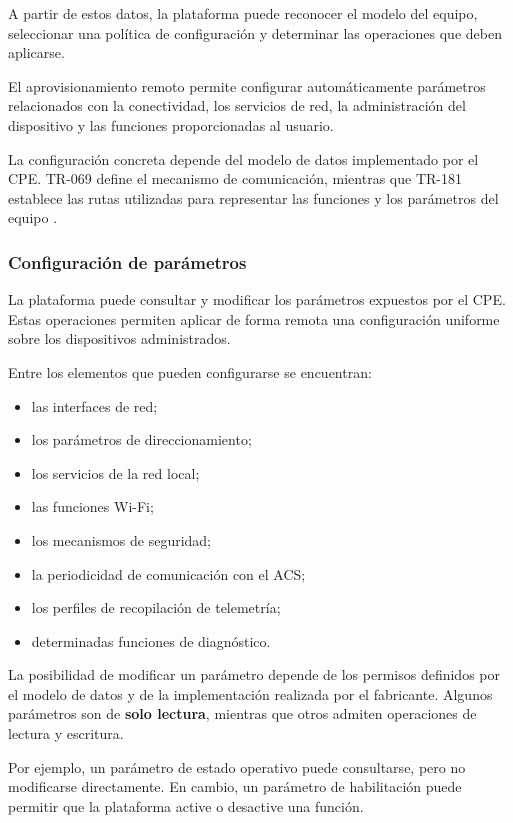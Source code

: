 A partir de estos datos, la plataforma puede reconocer el modelo del
equipo, seleccionar una política de configuración y determinar las
operaciones que deben aplicarse.

El aprovisionamiento remoto permite configurar automáticamente parámetros
relacionados con la conectividad, los servicios de red, la administración
del dispositivo y las funciones proporcionadas al usuario.

La configuración concreta depende del modelo de datos implementado por el
CPE. TR-069 define el mecanismo de comunicación, mientras que TR-181
establece las rutas utilizadas para representar las funciones y los
parámetros del equipo \cite{bbf_tr069,bbf_tr181}.


\subsubsection*{Configuración de parámetros}

La plataforma puede consultar y modificar los parámetros expuestos por el
CPE. Estas operaciones permiten aplicar de forma remota una configuración
uniforme sobre los dispositivos administrados.

Entre los elementos que pueden configurarse se encuentran:

\begin{itemize}
    \item las interfaces de red;
    \item los parámetros de direccionamiento;
    \item los servicios de la red local;
    \item las funciones Wi-Fi;
    \item los mecanismos de seguridad;
    \item la periodicidad de comunicación con el ACS;
    \item los perfiles de recopilación de telemetría;
    \item determinadas funciones de diagnóstico.
\end{itemize}

La posibilidad de modificar un parámetro depende de los permisos
definidos por el modelo de datos y de la implementación realizada por el
fabricante. Algunos parámetros son de \textbf{solo lectura}, mientras que
otros admiten operaciones de lectura y escritura.

Por ejemplo, un parámetro de estado operativo puede consultarse, pero no
modificarse directamente. En cambio, un parámetro de habilitación puede
permitir que la plataforma active o desactive una función.

